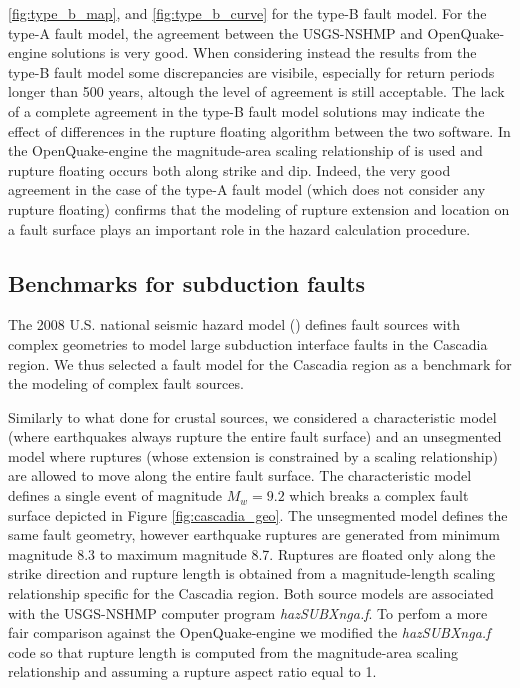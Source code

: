 \ref{fig:type_b_map}, and \ref{fig:type_b_curve} for the type-B fault model. For
the type-A fault model, the agreement between the USGS-NSHMP and
OpenQuake-engine solutions is very good. When considering instead the results
from the type-B fault model some discrepancies are visibile, especially for
return periods longer than 500 years, altough the level of agreement is still
acceptable. The lack of a complete agreement in the type-B fault model solutions
may indicate the effect of differences in the rupture floating algorithm between
the two software. In the OpenQuake-engine the magnitude-area scaling
relationship of \citet{wells1994} is used and rupture floating occurs both along
strike and dip. Indeed, the very good agreement in the case of the type-A fault
model (which does not consider any rupture floating) confirms that the modeling
of rupture extension and location on a fault surface plays an important role in
the hazard calculation procedure.
%
\subsection{Benchmarks for subduction faults}
The 2008 U.S. national seismic hazard model (\cite{petersen2008}) defines fault
sources with complex geometries to model large subduction interface faults in
the Cascadia region. We thus selected a fault model for the Cascadia region as a
benchmark for the modeling of complex fault sources.

Similarly to what done for crustal sources, we considered a characteristic model
(where earthquakes always rupture the entire fault surface) and an unsegmented
model where ruptures (whose extension is constrained by a scaling relationship)
are allowed to move along the entire fault surface. The characteristic model
defines a single event of magnitude $M_{w}=9.2$ which breaks a complex fault
surface depicted in Figure \ref{fig:cascadia_geo}. The unsegmented model defines
the same fault geometry, however earthquake ruptures are generated from minimum
magnitude 8.3 to maximum magnitude 8.7. Ruptures are floated only along the
strike direction and rupture length is obtained from a magnitude-length scaling
relationship specific for the Cascadia region. Both source models are associated
with the USGS-NSHMP computer program \textit{hazSUBXnga.f}. To perfom a more
fair comparison against the OpenQuake-engine we modified the
\textit{hazSUBXnga.f} code so that rupture length is computed from the
\citet{wells1994} magnitude-area scaling relationship and assuming a rupture
aspect ratio equal to 1.


